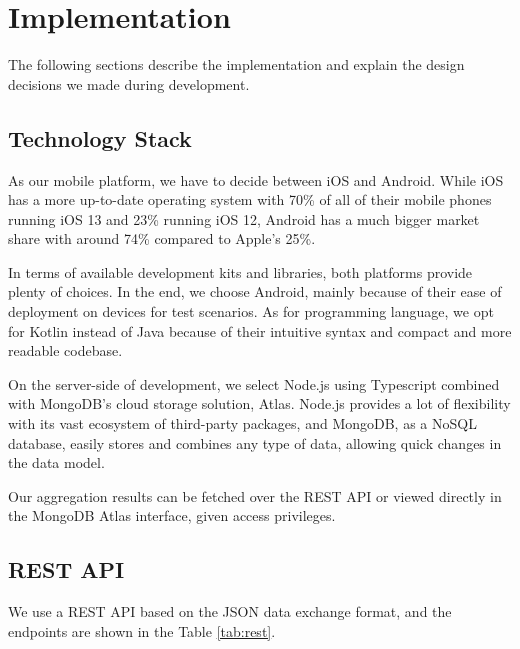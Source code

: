 
\chapter{Implementation}\label{chapter:implementation}

The following sections describe the implementation and explain the design decisions we made during development. 

\section{Technology Stack}

As our mobile platform, we have to decide between iOS and Android. While iOS has a more up-to-date operating system with 70\% of all of their mobile phones running iOS 13 and 23\% running iOS 12, Android has a much bigger market share with around 74\% compared to Apple's 25\%. 

In terms of available development kits and libraries, both platforms provide plenty of choices. In the end, we choose Android, mainly because of their ease of deployment on devices for test scenarios. As for programming language, we opt for Kotlin instead of Java because of their intuitive syntax and compact and more readable codebase.

On the server-side of development, we select Node.js using Typescript combined with MongoDB's cloud storage solution, Atlas. Node.js provides a lot of flexibility with its vast ecosystem of third-party packages, and MongoDB, as a NoSQL database, easily stores and combines any type of data, allowing quick changes in the data model.

Our aggregation results can be fetched over the REST API or viewed directly in the MongoDB Atlas interface, given access privileges.

\section{REST API}
\label{sec:api}
We use a REST API based on the JSON data exchange format, and the endpoints are shown in the Table \ref{tab:rest}.

